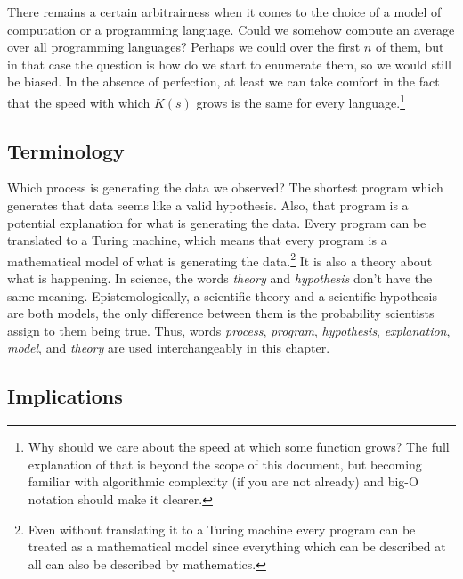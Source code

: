 \documentclass[oneside,hidelinks]{article}
\begin{document}
There remains a certain arbitrairness when it comes to the choice of a model of computation or a programming language.
Could we somehow compute an average over all programming languages?
Perhaps we could over the first $n$ of them, but in that case the question is how do we start to enumerate them, so we would still be biased.
In the absence of perfection, at least we can take comfort in the fact that the speed with which $K(s)$ grows is the same for every language.\footnote{
Why should we care about the speed at which some function grows?
The full explanation of that is beyond the scope of this document, but becoming familiar with algorithmic complexity (if you are not already) and big-O notation should make it clearer.
}

\newpage

\subsection{Terminology}

Which process is generating the data we observed?
The shortest program which generates that data seems like a valid hypothesis.
Also, that program is a potential explanation for what is generating the data.
Every program can be translated to a Turing machine, which means that every program is a mathematical model of what is generating the data.\footnote{Even without translating it to a Turing machine every program can be treated as a mathematical model since everything which can be described at all can also be described by mathematics.}
It is also a theory about what is happening.
In science, the words \textit{theory} and \textit{hypothesis} don't have the same meaning.
Epistemologically, a scientific theory and a scientific hypothesis are both models, the only difference between them is the probability scientists assign to them being true.
Thus, words \textit{process}, \textit{program}, \textit{hypothesis}, \textit{explanation}, \textit{model}, and \textit{theory} are used interchangeably in this chapter.

\newpage

\subsection{Implications}
\end{document}

